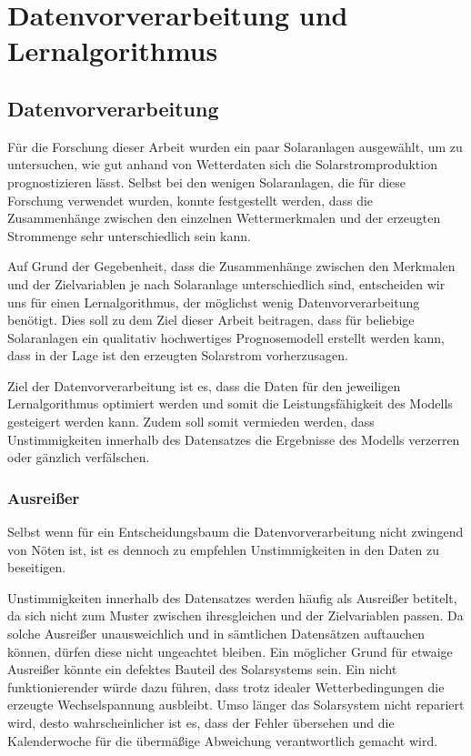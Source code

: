 \documentclass[12pt, a4paper]{article}
\begin{document}
\section{Datenvorverarbeitung und Lernalgorithmus}
\label{sec:data_algorithm}

\subsection{Datenvorverarbeitung}

Für die Forschung dieser Arbeit wurden ein paar Solaranlagen ausgewählt, um zu untersuchen, wie gut anhand von Wetterdaten sich die Solarstromproduktion prognostizieren lässt. Selbst bei den wenigen Solaranlagen, die für diese Forschung verwendet wurden, konnte festgestellt werden, dass die Zusammenhänge zwischen den einzelnen Wettermerkmalen und der erzeugten Strommenge sehr unterschiedlich sein kann.

Auf Grund der Gegebenheit, dass die Zusammenhänge zwischen den Merkmalen und der Zielvariablen je nach Solaranlage unterschiedlich sind, entscheiden wir uns für einen Lernalgorithmus, der möglichst wenig Datenvorverarbeitung benötigt. Dies soll zu dem Ziel dieser Arbeit beitragen, dass für beliebige Solaranlagen ein qualitativ hochwertiges Prognosemodell erstellt werden kann, dass in der Lage ist den erzeugten Solarstrom vorherzusagen.

Ziel der Datenvorverarbeitung ist es, dass die Daten für den jeweiligen Lernalgorithmus optimiert werden und somit die Leistungsfähigkeit des Modells gesteigert werden kann. Zudem soll somit vermieden werden, dass Unstimmigkeiten innerhalb des Datensatzes die Ergebnisse des Modells verzerren oder gänzlich verfälschen.

\subsubsection{Ausreißer}

Selbst wenn für ein Entscheidungsbaum die Datenvorverarbeitung nicht zwingend von Nöten ist, ist es dennoch zu empfehlen Unstimmigkeiten in den Daten zu beseitigen.

Unstimmigkeiten innerhalb des Datensatzes werden häufig als Ausreißer betitelt, da sich nicht zum Muster zwischen ihresgleichen und der Zielvariablen passen. Da solche Ausreißer unausweichlich und in sämtlichen Datensätzen auftauchen können, dürfen diese nicht ungeachtet bleiben. Ein möglicher Grund für etwaige Ausreißer könnte ein defektes Bauteil des Solarsystems sein. Ein nicht funktionierender würde dazu führen, dass trotz idealer Wetterbedingungen die erzeugte Wechselspannung ausbleibt. Umso länger das Solarsystem nicht repariert wird, desto wahrscheinlicher ist es, dass der Fehler übersehen und die Kalenderwoche für die übermäßige Abweichung verantwortlich gemacht wird.
\end{document}
